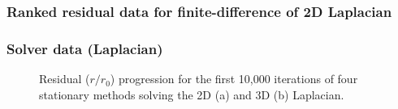 \documentclass{beamer}
\begin{document}
\begin{frame}
	\frametitle{Ranked residual data for finite-difference of 2D Laplacian}
	\begin{figure}[H]
		\centering
	\end{figure}
\end{frame}

\begin{frame}
	\frametitle{Solver data (Laplacian)}
	\begin{figure}[H]
		\centering
		\caption{Residual ($r / r_0$) progression for the first 10,000 iterations of four stationary methods solving the 2D (a) and 3D (b) Laplacian.}
	\end{figure}
\end{frame}
\end{document}
